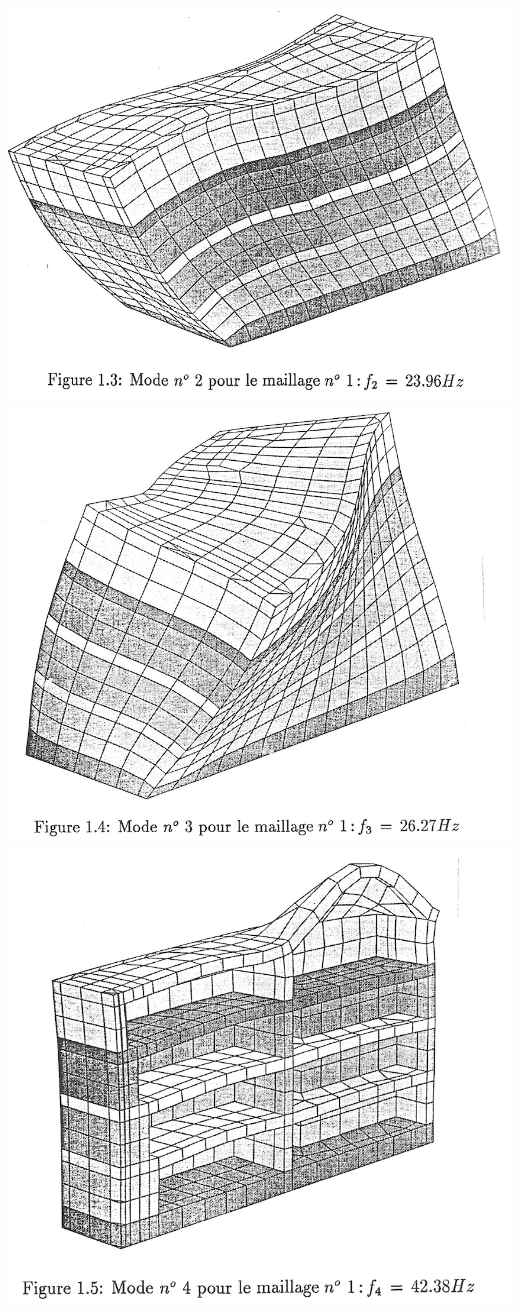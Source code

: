 \documentclass{article}
\begin{document}
\includegraphics[scale=0.25]{castemLCPC02.png} 
\includegraphics[scale=0.25]{castemLCPC03.png} 
\includegraphics[scale=0.25]{castemLCPC04.png} 
\end{document}
